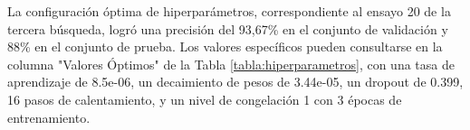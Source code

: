 La configuración óptima de hiperparámetros, correspondiente al ensayo 20 de la tercera búsqueda, logró una precisión del 93,67\% en el conjunto de validación y 88\% en el conjunto de prueba. Los valores específicos pueden consultarse en la columna "Valores Óptimos" de la Tabla \ref{tabla:hiperparametros}, con una tasa de aprendizaje de 8.5e-06, un decaimiento de pesos de 3.44e-05, un dropout de 0.399, 16 pasos de calentamiento, y un nivel de congelación 1 con 3 épocas de entrenamiento.


